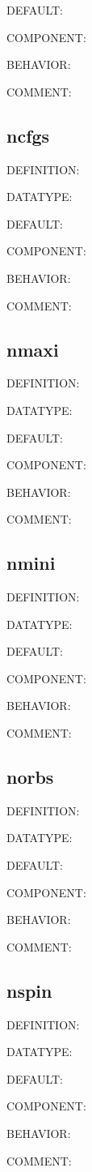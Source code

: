 {\color{blue}DEFAULT:}

{\color{brown}COMPONENT:}

{\color{purple}BEHAVIOR:}

{\color{olive}COMMENT:}

\subsection{ncfgs}
{\color{red}DEFINITION:}

{\color{green}DATATYPE:}

{\color{blue}DEFAULT:}

{\color{brown}COMPONENT:}

{\color{purple}BEHAVIOR:}

{\color{olive}COMMENT:}

\subsection{nmaxi}
{\color{red}DEFINITION:}

{\color{green}DATATYPE:}

{\color{blue}DEFAULT:}

{\color{brown}COMPONENT:}

{\color{purple}BEHAVIOR:}

{\color{olive}COMMENT:}

\subsection{nmini}
{\color{red}DEFINITION:}

{\color{green}DATATYPE:}

{\color{blue}DEFAULT:}

{\color{brown}COMPONENT:}

{\color{purple}BEHAVIOR:}

{\color{olive}COMMENT:}

\subsection{norbs}
{\color{red}DEFINITION:}

{\color{green}DATATYPE:}

{\color{blue}DEFAULT:}

{\color{brown}COMPONENT:}

{\color{purple}BEHAVIOR:}

{\color{olive}COMMENT:}

\subsection{nspin}
{\color{red}DEFINITION:}

{\color{green}DATATYPE:}

{\color{blue}DEFAULT:}

{\color{brown}COMPONENT:}

{\color{purple}BEHAVIOR:}

{\color{olive}COMMENT:}
